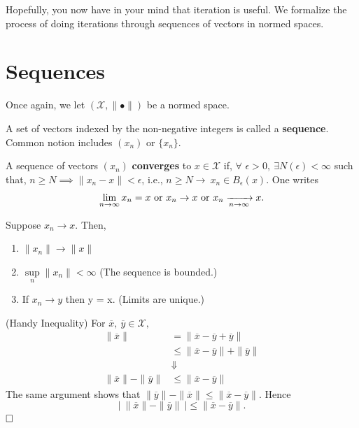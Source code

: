 \Qed




Hopefully, you now have in your mind that iteration is useful. We formalize the process of doing iterations through sequences of vectors in normed spaces.

\section{Sequences}
\label{sec:sequences}

Once again, we let $(\mathcal{X}, \| \bullet\|)$ be a normed space. 

\begin{definition} A set of vectors indexed by the non-negative integers is called a \textbf{ sequence}. Common notion includes $(x_n)$ or $\{x_n\}$. 
\end{definition}

\begin{definition} A sequence of vectors $(x_n)$ \textbf{ converges} to $x\in \mathcal{X}$ if, $\forall$ ${\epsilon} > 0,\ {\exists} N({\epsilon}) < {\infty}$ such that, $n{\geq}N \implies \|x_n-x\| < \epsilon$, i.e., $n {\geq}N\to \ x_n {\in} B_{\epsilon}(x).$ One writes
    \begin{equation*}
        \lim\limits_{n \to \infty} x_n= x\textnormal{ or }x_n \to  x\textnormal{ or }x_n  \xrightarrow[n \to \infty]{} x.
    \end{equation*}

\end{definition}

\begin{prop} Suppose $x_n \to x $. Then,
    \begin{enumerate}
       \renewcommand{\labelenumi}{(\alph{enumi})}
        \setlength{\itemsep}{.1cm}
        \item $\| x_n \| \to \| x \|$
        \item $\sup\limits_{n}\| x_n \| < \infty$ (The sequence is bounded.)
        \item If $x_n \to y$ then y = x. (Limits are unique.)
    \end{enumerate}
    
\end{prop} 

\begin{rem} 
\label{rem:HandyInequality}
(Handy Inequality) For $\overline{x},\ \overline{y}\in \mathcal{X},$
    \begin{align*}
 \| \overline{x} \| &= \| \overline{x}-\overline{y}+\overline{y} \| \\
 &\leq \| \overline{x}-\overline{y} \| + \| \overline{y} \|\\
 &\Downarrow \\
  \| \overline{x} \| -\| \overline{y} \| &\leq \| \overline{x}-\overline{y} \|
    \end{align*}
    The same argument shows that $ \| \overline{y} \| -\| \overline{x} \| \leq \| \overline{x}-\overline{y} \|$. Hence
    $$\boxed{ | ~\| \overline{x} \| - \| \overline{y} \| ~|  \leq \| \overline{x}-\overline{y}\|.}$$
    $\hfill \square$

\end{rem}

